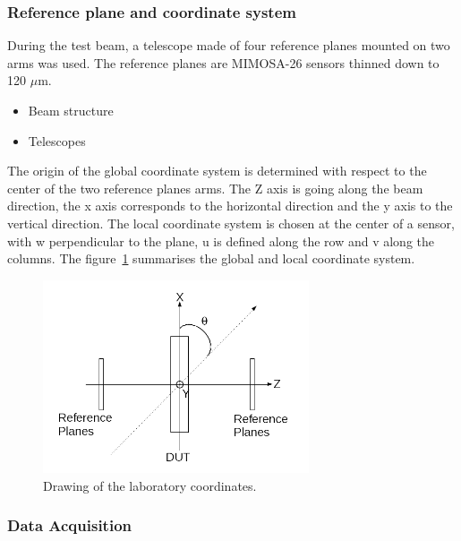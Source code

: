       \subsubsection{Reference plane and coordinate system}

    During the test beam, a telescope made of four reference planes mounted on two arms was used.
    The reference planes are MIMOSA-26 sensors thinned down to 120 $\mu\text{m}$.


     \begin{itemize}
       \item Beam structure
       \item Telescopes
     \end{itemize}

    \begin{figure}
    \end{figure}

    The origin of the global coordinate system is determined with respect to the center of the two reference planes arms.
    The Z axis is going along the beam direction, the x axis corresponds to the horizontal direction and the y axis to the vertical direction.
    The local coordinate system is chosen at the center of a sensor, with w perpendicular to the plane, u is defined along the row and v along the columns.
    The figure~\ref{fig:labCoordinates} summarises the global and local coordinate system.

    \begin{figure}
      \centering
      \includegraphics[width = 0.7\textwidth]{Pictures/deformation/lab_frame.png}
      \caption{Drawing of the laboratory coordinates.}
      \label{fig:labCoordinates}
    \end{figure}

      \subsubsection{Data Acquisition}

